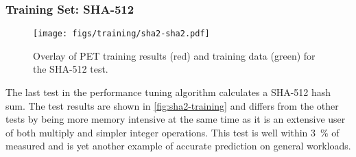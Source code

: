 \newpage

\subsubsection{Training Set: SHA-512}
\begin{figure}[htb]
    \centering
    \texttt{[image: figs/training/sha2-sha2.pdf]}
    \caption{Overlay of PET training results (red) and training data (green) for
    the SHA-512 test.}
    \label{fig:sha2-training}
\end{figure}

The last test in the performance tuning algorithm calculates a SHA-512 hash sum.
The test results are shown in \autoref{fig:sha2-training} and differs from the
other tests by being more memory intensive at the same time as it is an
extensive user of both multiply and simpler integer operations. This test is
well within 3~\% of measured and is yet another example of accurate prediction
on general workloads.
